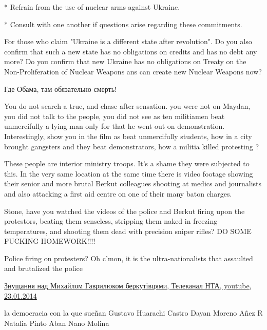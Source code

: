 * Refrain from the use of nuclear arms against Ukraine.

* Consult with one another if questions arise regarding these commitments.

For those who claim "Ukraine is a different state after revolution". Do you
also confirm that such a new state has no obligations on credits and has no
debt any more? Do you confirm that new Ukraine has no obligations on Treaty on
the Non-Proliferation of Nuclear Weapons ans can create new Nuclear Weapons
now?


Где Обама, там обязательно смерть!


You do not search a true, and chase after sensation. you were not on Maydan,
you did not talk to the people, you did not see as ten militiamen beat
unmercifully a lying man only for that he went out on demonstration.
Interestingly, show you in the film as beat unmercifully students, how in a
city brought gangsters and they beat demonstrators, how a militia killed
protesting ?


These people are interior ministry troops. It's a shame they were subjected to
this. In the very same location at the same time there is video footage showing
their senior and more brutal Berkut colleagues shooting at medics and
journalists and also attacking a first aid centre on one of their many baton
charges.


Stone, have you watched the videos of the police and Berkut firing upon the
protestors, beating them senseless, stripping them naked in freezing
temperatures, and shooting them dead with precision sniper rifles? DO SOME
FUCKING HOMEWORK!!!!

\begin{itemize} %
Police firing on protesters? Oh c'mon, it is the ultra-nationalists that assaulted and brutalized the police
\end{itemize} %


\href{https://www.youtube.com/watch?v=-NvkVMD0dQQ}{%
Знущання над Михайлом Гаврилюком беркутівцями, Телеканал НТА, youtube, 23.01.2014%
}


la democracia con la que sueñan Gustavo Huarachi Castro Dayan Moreno Añez R
Natalia Pinto Aban Nano Molina

